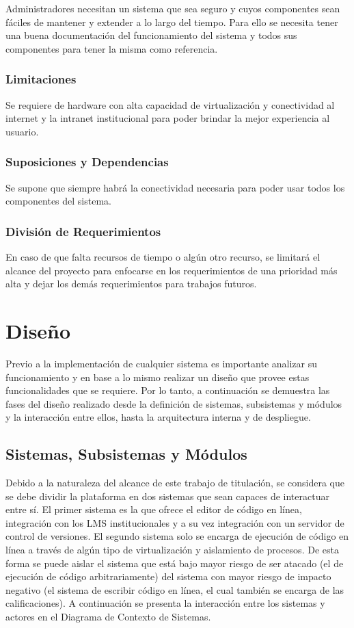 Administradores necesitan un sistema que sea seguro y cuyos componentes sean fáciles de mantener y extender a lo largo del tiempo. Para ello se necesita tener una buena documentación del funcionamiento del sistema y todos sus componentes para tener la misma como referencia.

\subsubsection{Limitaciones}
Se requiere de hardware con alta capacidad de virtualización y conectividad al internet y la intranet institucional para poder brindar la mejor experiencia al usuario.

\subsubsection{Suposiciones y Dependencias}
Se supone que siempre habrá la conectividad necesaria para poder usar todos los componentes del sistema.

\subsubsection{División de Requerimientos}
En caso de que falta recursos de tiempo o algún otro recurso, se limitará el alcance del proyecto para enfocarse en los requerimientos de una prioridad más alta y dejar los demás requerimientos para trabajos futuros.

\section{Diseño}
Previo a la implementación de cualquier sistema es importante analizar su funcionamiento y en base a lo mismo realizar un diseño que provee estas funcionalidades que se requiere. Por lo tanto, a continuación se demuestra las fases del diseño realizado desde la definición de sistemas, subsistemas y módulos y la interacción entre ellos, hasta la arquitectura interna y de despliegue.

\subsection{Sistemas, Subsistemas y Módulos}
Debido a la naturaleza del alcance de este trabajo de titulación, se considera que se debe dividir la plataforma en dos sistemas que sean capaces de interactuar entre sí. El primer sistema es la que ofrece el editor de código en línea, integración con los LMS institucionales y a su vez integración con un servidor de control de versiones. El segundo sistema solo se encarga de ejecución de código en línea a través de algún tipo de virtualización y aislamiento de procesos. De esta forma se puede aislar el sistema que está bajo mayor riesgo de ser atacado (el de ejecución de código arbitrariamente) del sistema con mayor riesgo de impacto negativo (el sistema de escribir código en línea, el cual también se encarga de las calificaciones). A continuación se presenta la interacción entre los sistemas y actores en el Diagrama de Contexto de Sistemas.

